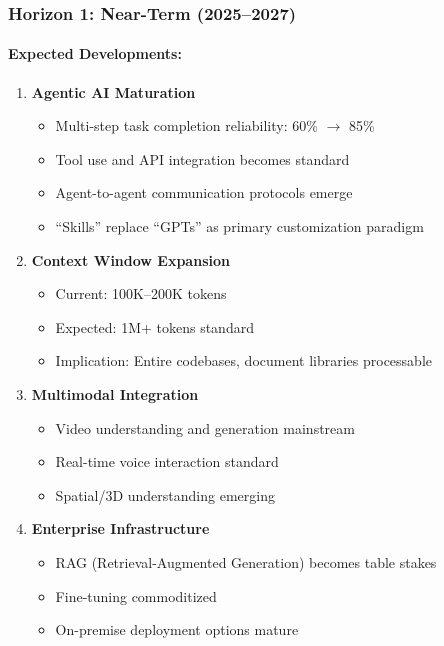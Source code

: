 \subsubsection{Horizon 1: Near-Term (2025--2027)}

\paragraph{Expected Developments:}
\begin{enumerate}
    \item \textbf{Agentic AI Maturation}
    \begin{itemize}
        \item Multi-step task completion reliability: 60\% $\rightarrow$ 85\%
        \item Tool use and API integration becomes standard
        \item Agent-to-agent communication protocols emerge
        \item ``Skills'' replace ``GPTs'' as primary customization paradigm
    \end{itemize}

    \item \textbf{Context Window Expansion}
    \begin{itemize}
        \item Current: 100K--200K tokens
        \item Expected: 1M+ tokens standard
        \item Implication: Entire codebases, document libraries processable
    \end{itemize}

    \item \textbf{Multimodal Integration}
    \begin{itemize}
        \item Video understanding and generation mainstream
        \item Real-time voice interaction standard
        \item Spatial/3D understanding emerging
    \end{itemize}

    \item \textbf{Enterprise Infrastructure}
    \begin{itemize}
        \item RAG (Retrieval-Augmented Generation) becomes table stakes
        \item Fine-tuning commoditized
        \item On-premise deployment options mature
    \end{itemize}
\end{enumerate}

